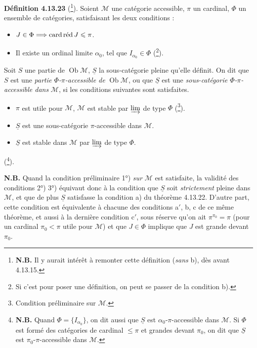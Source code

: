 \documentclass[11pt]{article}
\newcommand{\printedpage}[1]{\marginpar{\footnotesize p.~#1}}
\newcommand{\msp}[1]{\marginpar{\footnotesize [#1]}}
\newcommand{\Ob}{\operatorname{Ob}}
\newcommand{\cardred}{\mathop{\textup{card\,réd}}\nolimits}
\begin{document}
\textbf{Définition 4.13.23} (\footnote{\textbf{N.B.} Il y aurait intérêt à remonter cette définition (\textit{sans} b), dès avant 4.13.15.}). Soient $\mathcal{M}$ une catégorie accessible, $\pi$ un cardinal, $\Phi$ un ensemble de catégories, satisfaisant les deux conditions :
\begin{itemize}[leftmargin=2.5em]
\item[a)] $J\in\Phi\Longrightarrow\cardred J\leqslant\pi$.
\item[b)] Il existe un ordinal limite $\alpha_0$, tel que $I_{\alpha_0}\in\Phi$ (\footnote{Si c'est pour poser une définition, on peut se passer de la condition b).}).
\end{itemize}
\msp{page 344}
Soit $S$ une partie de $\Ob\mathcal{M}$, $\underline{S}$ la sous-catégorie pleine qu'elle définit. On dit que $S$ est une \textit{partie $\Phi$-$\pi$-accessible de} $\Ob\mathcal{M}$, ou que $\underline{S}$ est une \textit{sous-catégorie $\Phi$-$\pi$-accessible dans} $\mathcal{M}$, si les conditions suivantes sont satisfaites.
\begin{itemize}[leftmargin=2.5em]
\item[1°)] $\pi$ est utile pour $\mathcal{M}$, $\mathcal{M}$ est stable par $\varinjlim$ de type $\Phi$ (\footnote{Condition préliminaire sur $\mathcal{M}$.}).
\item[2°)] $\underline{S}$ est une sous-catégorie $\pi$-accessible dans $\mathcal{M}$.
\item[3°)] $\underline{S}$ est stable dans $\mathcal{M}$ par $\varinjlim$ de type $\Phi$.
\end{itemize}
(\footnote{\textbf{N.B.} Quand $\Phi=\{I_{\alpha_0}\}$, on dit aussi que $\underline{S}$ est $\alpha_0$-$\pi$-accessible dans $\mathcal{M}$. Si $\Phi$ est formé des catégories de cardinal $\leqslant\pi$ et grandes devant $\pi_0$, on dit que $\underline{S}$ est $\pi_0$-$\pi$-accessible dans $\mathcal{M}$.}).

\textbf{N.B.} Quand la condition préliminaire 1°) \textit{sur} $\mathcal{M}$ est satisfaite, la validité des conditions 2°) 3°) équivaut donc à la condition que $\underline{S}$ soit \textit{strictement} pleine dans $\mathcal{M}$, et que de
\printedpage{131}
plus $\underline{S}$ satisfasse la condition a) du théorème 4.13.22. D'autre part, cette condition est équivalente à chacune des conditions a$'$, b, c de ce même théorème, et aussi à la dernière condition c$'$, sous réserve qu'on ait $\pi^{\pi_0}=\pi$ (pour un cardinal $\pi_0<\pi$ utile pour $\mathcal{M}$) et que $J\in\Phi$ implique que $J$ est grande devant $\pi_0$.
\end{document}
